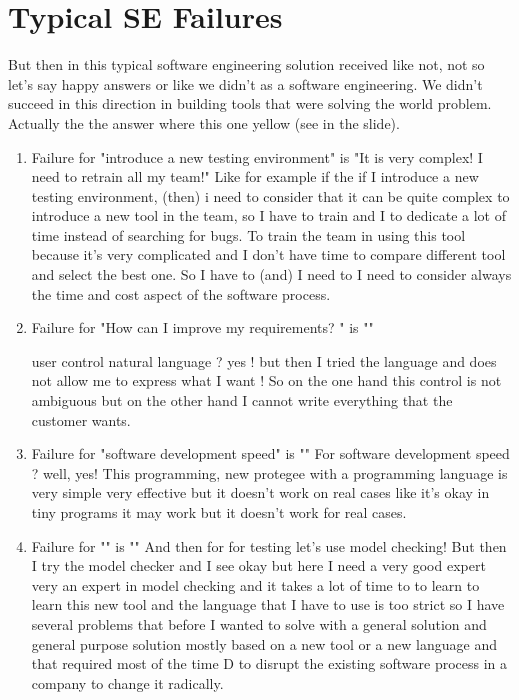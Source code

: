 \documentclass[conference, compsoc, twoside]{IEEEtran}
\begin{document}
\section{Typical SE Failures} %
But then in this typical software engineering solution received like not, not so let's say happy answers or like we didn't as a software engineering.
We didn't succeed in this direction in building tools that were solving the world problem. 
Actually the the answer where this one yellow (see in the slide). 
\begin{enumerate}
	\item Failure for "introduce a new testing environment" is "It is very complex! I need to retrain all my team!"
	Like for example if the if I introduce a new testing environment, (then) i need to consider that it can be quite complex to introduce a new tool in the team, so I have to train and I to dedicate a lot of time instead of searching for bugs. To train the team in using this tool because it's very complicated and I don't have time to compare different tool and select the best one.
	So I have to (and) I need to I need to consider always the time and cost aspect of the software process.
	\item Failure for "How can I improve my requirements? " is ""

user control natural language ? yes ! but then I tried the language and does not allow me to express what I want ! So on the one hand this control is not ambiguous but on the other hand I cannot write everything that the customer wants.

	\item Failure for "software development speed" is ""
For software development speed ? well, yes! This programming, new protegee with a programming language is very simple very effective but it doesn't work on real cases like it's okay in tiny programs it may work but it doesn't work for real cases.
	\item Failure for "" is ""
	And then for for testing let's use model checking! But then I try the model checker and I see okay but here I need a very good expert very an expert in model checking and it takes a lot of time to to learn to learn this new tool and the language that I have to use is too strict 
so I have several problems that before I wanted to solve with a general solution and general purpose solution mostly based on a new tool or a new language and that required most of the time D to disrupt the existing software process in a company to change it radically. 
\end{enumerate}
\end{document}
